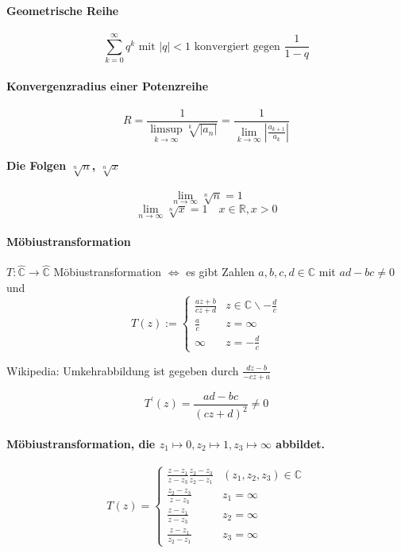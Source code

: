 \documentclass[a4paper, 10pt, DIV20, headings=small]{scrartcl}
\theoremstyle{definition}
\theoremstyle{plain}
\begin{document}
\paragraph{Geometrische Reihe}
$$\sum\limits_{k=0}^\infty q^k \text{ mit } |q| < 1 \text{ konvergiert gegen } \frac{1}{1-q}$$

\paragraph{Konvergenzradius einer Potenzreihe}
$$R = \frac{1}{\limsup\limits_{k\rightarrow \infty} \sqrt[k]{|a_n|}} = \frac{1}{\lim\limits_{k\rightarrow \infty}{|\frac{a_{k+1}}{a_k}|}}$$

\paragraph{Die Folgen $\sqrt[n]{n}$, $\sqrt[n]{x}$}
$$\lim_{n \rightarrow \infty} \sqrt[n]{n} = 1$$
$$\lim_{n \rightarrow \infty} \sqrt[n]{x} = 1 \quad x \in \mathbb{R}, x > 0$$

\paragraph{Möbiustransformation}
$T \colon \hat{\mathbb{C}} \rightarrow \hat{\mathbb{C}}$ Möbiustransformation $\Leftrightarrow$
es gibt Zahlen $a,b,c,d \in \mathbb{C}$ mit $ad-bc \neq 0$ und
$$T(z) := \begin{cases} \frac{az+b}{cz+d} & z \in \mathbb{C} \backslash -\frac{d}{c} \\
\frac{a}{c} & z = \infty \\
\infty & z = - \frac{d}{c} \end{cases}$$

Wikipedia: Umkehrabbildung ist gegeben durch $\frac{dz-b}{-cz+a}$

$$T^\prime(z) = \frac{ad-bc}{(cz+d)^2} \neq 0$$

\paragraph{Möbiustransformation, die $z_1 \mapsto 0, z_2 \mapsto 1, z_3 \mapsto \infty $ abbildet.}
$$T(z) = \begin{cases} \frac{z-z_1}{z-z_3} \frac{z_2-z_3}{z_2-z_1} & (z_1,z_2,z_3) \in \mathbb{C} \\
\frac{z_2-z_3}{z-z_3} & z_1 = \infty \\
\frac{z-z_1}{z-z_3} & z_2 = \infty \\
\frac{z-z_1}{z_2-z_1} & z_3 = \infty \end{cases}$$
\end{document}
